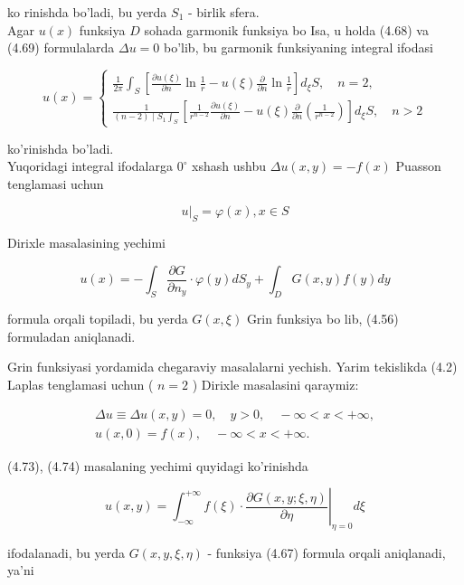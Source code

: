 \documentclass[10pt]{article}
\begin{document}
ko rinishda bo'ladi, bu yerda $S_{1}$ - birlik sfera.\\
Agar $u(x)$ funksiya $D$ sohada garmonik funksiya bo Isa, u holda (4.68) va (4.69) formulalarda $\Delta u=0$ bo'lib, bu garmonik funksiyaning integral ifodasi

\[
u(x)=\left\{\begin{array}{l}
\frac{1}{2 \pi} \int_{S}\left[\frac{\partial u(\xi)}{\partial n} \ln \frac{1}{r}-u(\xi) \frac{\partial}{\partial n} \ln \frac{1}{r}\right] d_{\xi} S, \quad n=2,  \tag{4.70}\\
\frac{1}{(n-2) \mid S_{1} \int_{S}}\left[\frac{1}{r^{n-2}} \frac{\partial u(\xi)}{\partial n}-u(\xi) \frac{\partial}{\partial n}\left(\frac{1}{r^{n-2}}\right)\right] d_{\xi} S, \quad n>2
\end{array}\right.
\]

ko'rinishda bo'ladi.\\
Yuqoridagi integral ifodalarga $0^{\circ}$ xshash ushbu $\Delta u(x, y)=-f(x)$ Puasson tenglamasi uchun

$$
\left.u\right|_{S}=\varphi(x), x \in S
$$

Dirixle masalasining yechimi


\begin{equation*}
u(x)=-\int_{S} \frac{\partial G}{\partial n_{y}} \cdot \varphi(y) d S_{y}+\int_{D} G(x, y) f(y) d y \tag{4.72}
\end{equation*}


formula orqali topiladi, bu yerda $G(x, \xi)$ Grin funksiya bo lib, (4.56) formuladan aniqlanadi.

Grin funksiyasi yordamida chegaraviy masalalarni yechish. Yarim tekislikda (4.2) Laplas tenglamasi uchun ( $n=2$ ) Dirixle masalasini qaraymiz:


\begin{gather*}
\Delta u \equiv \Delta u(x, y)=0, \quad y>0, \quad-\infty<x<+\infty,  \tag{4.73}\\
u(x, 0)=f(x), \quad-\infty<x<+\infty . \tag{4.74}
\end{gather*}


(4.73), (4.74) masalaning yechimi quyidagi ko'rinishda


\begin{equation*}
u(x, y)=\left.\int_{-\infty}^{+\infty} f(\xi) \cdot \frac{\partial G(x, y ; \xi, \eta)}{\partial \eta}\right|_{\eta=0} d \xi \tag{4.75}
\end{equation*}


ifodalanadi, bu yerda $G(x, y, \xi, \eta)$ - funksiya (4.67) formula orqali aniqlanadi, ya'ni
\end{document}
